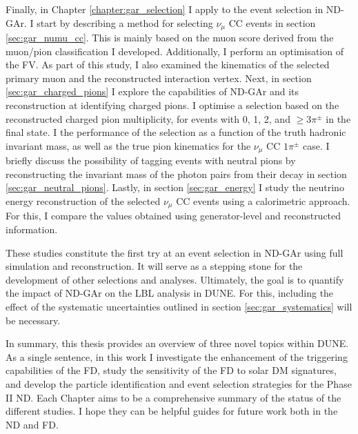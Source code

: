 \begin{comment}
the muon and pion classification may be refined additional feature engineering. explore the implications of the new clustering algorithm
\end{comment}

Finally, in Chapter \ref{chapter:gar_selection} I apply to the event selection in ND-GAr. I start by describing a method for selecting $\nu_{\mu}$ CC events in section \ref{sec:gar_numu_cc}. This is mainly based on the muon score derived from the muon/pion classification I developed. Additionally, I perform an optimisation of the FV. As part of this study, I also examined the kinematics of the selected primary muon and the reconstructed interaction vertex. Next, in section \ref{sec:gar_charged_pions} I explore the capabilities of ND-GAr and its reconstruction at identifying charged pions. I optimise a selection based on the reconstructed charged pion multiplicity, for events with 0, 1, 2, and $\geq 3 \pi^{\pm}$ in the final state. I the performance of the selection as a function of the truth hadronic invariant mass, as well as the true pion kinematics for the $\nu_{\mu}$ CC $1\pi^{\pm}$ case. I briefly discuss the possibility of tagging events with neutral pions by reconstructing the invariant mass of the photon pairs from their decay in section \ref{sec:gar_neutral_pions}. Lastly, in section \ref{sec:gar_energy} I study the neutrino energy reconstruction of the selected $\nu_{\mu}$ CC events using a calorimetric approach. For this, I compare the values obtained using generator-level and reconstructed information.

These studies constitute the first try at an event selection in ND-GAr using full simulation and reconstruction. It will serve as a stepping stone for the development of other selections and analyses. Ultimately, the goal is to quantify the impact of ND-GAr on the LBL analysis in DUNE. For this, including the effect of the systematic uncertainties outlined in section \ref{sec:gar_systematics} will be necessary.

In summary, this thesis provides an overview of three novel topics within DUNE. As a single sentence, in this work I investigate the enhancement of the triggering capabilities of the FD, study the sensitivity of the FD to solar DM signatures, and develop the particle identification and event selection strategies for the Phase II ND. Each Chapter aims to be a comprehensive summary of the status of the different studies. I hope they can be helpful guides for future work both in the ND and FD.